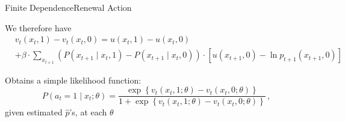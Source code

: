 \documentclass[11pt,aspectratio=169]{beamer}
\begin{document}
\begin{frame}{Finite Dependence}{Renewal Action}

We therefore have
  \begin{align*}
   & v_t(x_t,1) - v_t(x_t,0) = u(x_t,1) - u(x_t,0) \\
   & + \beta \cdot \sum_{x_{t+1}} (P(x_{t+1}\mid x_t,1) - P(x_{t+1} \mid x_t,0))\cdot  [u(x_{t+1},0) - \ln p_{t+1}(x_{t+1},0)]
  \end{align*}
  
Obtains a simple likelihood function: 
  $$ P(a_t=1 \mid x_t ;\theta) = \frac{\exp\left\{ v_t(x_t,1;\theta) - v_t(x_t,0;\theta) \right\}}{1 + \exp\left\{ v_t(x_t,1;\theta) - v_t(x_t,0;\theta) \right\}} \, ,$$
  given estimated $\hat{p}$'s, at each $\theta$
  
\end{frame}














\end{document}
